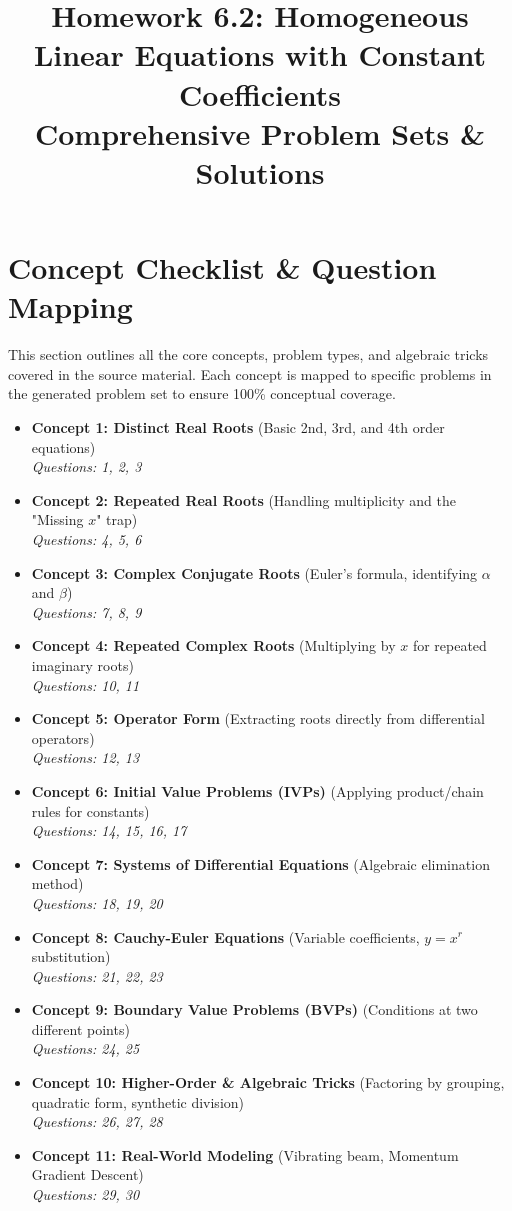 \documentclass[12pt]{article}
\title{Homework 6.2: Homogeneous Linear Equations with Constant Coefficients \\ \large Comprehensive Problem Sets \& Solutions}
\author{}
\date{}
\begin{document}
\maketitle
\tableofcontents
\newpage

\section{Concept Checklist \& Question Mapping}
This section outlines all the core concepts, problem types, and algebraic tricks covered in the source material. Each concept is mapped to specific problems in the generated problem set to ensure 100\% conceptual coverage.

\begin{itemize}
    \item \textbf{Concept 1: Distinct Real Roots} (Basic 2nd, 3rd, and 4th order equations) \\
    \textit{Questions: 1, 2, 3}
    \item \textbf{Concept 2: Repeated Real Roots} (Handling multiplicity and the "Missing $x$" trap) \\
    \textit{Questions: 4, 5, 6}
    \item \textbf{Concept 3: Complex Conjugate Roots} (Euler's formula, identifying $\alpha$ and $\beta$) \\
    \textit{Questions: 7, 8, 9}
    \item \textbf{Concept 4: Repeated Complex Roots} (Multiplying by $x$ for repeated imaginary roots) \\
    \textit{Questions: 10, 11}
    \item \textbf{Concept 5: Operator Form} (Extracting roots directly from differential operators) \\
    \textit{Questions: 12, 13}
    \item \textbf{Concept 6: Initial Value Problems (IVPs)} (Applying product/chain rules for constants) \\
    \textit{Questions: 14, 15, 16, 17}
    \item \textbf{Concept 7: Systems of Differential Equations} (Algebraic elimination method) \\
    \textit{Questions: 18, 19, 20}
    \item \textbf{Concept 8: Cauchy-Euler Equations} (Variable coefficients, $y=x^r$ substitution) \\
    \textit{Questions: 21, 22, 23}
    \item \textbf{Concept 9: Boundary Value Problems (BVPs)} (Conditions at two different points) \\
    \textit{Questions: 24, 25}
    \item \textbf{Concept 10: Higher-Order \& Algebraic Tricks} (Factoring by grouping, quadratic form, synthetic division) \\
    \textit{Questions: 26, 27, 28}
    \item \textbf{Concept 11: Real-World Modeling} (Vibrating beam, Momentum Gradient Descent) \\
    \textit{Questions: 29, 30}
\end{itemize}
\end{document}
